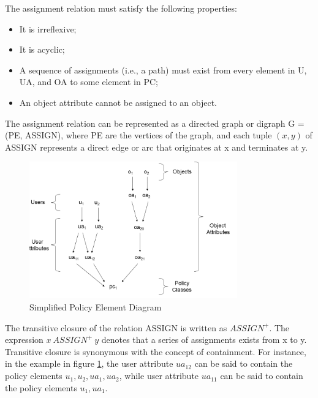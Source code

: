 \documentclass[12pt,a4paper,titlepage]{book}
\begin{document}
	The assignment relation must satisfy the following properties:
	
	\begin{itemize}
	
		\item It is irreflexive;
		
		\item It is acyclic;
		
		\item A sequence of assignments (i.e., a path) must exist from every element in U, UA, and OA to some element in PC;
		
		\item An object attribute cannot be assigned to an object.
	
	\end{itemize}

	The assignment relation can be represented as a directed graph or digraph G = (PE, ASSIGN),
	where PE are the vertices of the graph, and each tuple $(x, y)$ of ASSIGN represents a direct edge or arc that originates at x and terminates at y.
	
	\begin{figure}[h]
		\centering
		\includegraphics[width = 0.8\textwidth]{images/simplified_PE_diagram.png}
		\caption{Simplified Policy Element Diagram}
		\label{fig:simplifiedPEdiagram}
	\end{figure}
	
	The transitive closure of the relation ASSIGN is written as $ASSIGN^+$. The expression $x \ 
	ASSIGN^+ \ y$ denotes that a series of assignments exists from x to y. Transitive closure is synonymous with the concept of containment. For instance, in the example in figure  \ref{fig:simplifiedPEdiagram}, the user attribute $ ua_{12} $ can be said to contain the policy elements $ u_1, u_2, ua_1, ua_2 $, while user attribute $ ua_{11} $ can be said to contain the policy elements $ u_1, ua_1 $.
	
\end{document}
